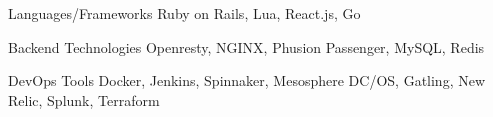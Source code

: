 

\begin{cvskills}

  \cvskill
    {Languages/Frameworks} %
    {Ruby on Rails, Lua, React.js, Go} %


  \cvskill
    {Backend Technologies} %
    {Openresty, NGINX, Phusion Passenger, MySQL, Redis} %

  \cvskill
    {DevOps Tools} %
    {Docker, Jenkins, Spinnaker, Mesosphere DC/OS, Gatling, New Relic, Splunk, Terraform} %

\end{cvskills}
